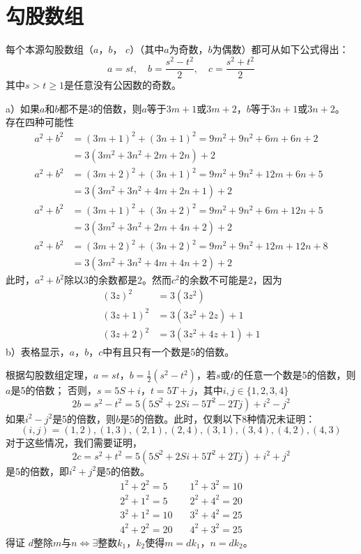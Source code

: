 \chapter{勾股数组}
\begin{theorem}[勾股数组定理]
每个本源勾股数组（$a$，$b$，  $c$）（其中$a$为奇数，$b$为偶数）都可从如下公式得出：
\[a=st,\quad b=\frac{s^2-t^2}{2},\quad c=\frac{s^2+t^2}{2}\]
其中$s>t\ge1$是任意没有公因数的奇数。
\end{theorem}
%
\exercise
a）如果$a$和$b$都不是3的倍数，则$a$等于$3m+1$或$3m+2$，$b$等于$3n+1$或$3n+2$。
存在四种可能性
\begin{align*}
a^2+b^2&=(3m+1)^2+(3n+1)^2=9m^2+9n^2+6m+6n+2\\
&=3(3m^2+3n^2+2m+2n)+2\\
a^2+b^2&=(3m+2)^2+(3n+1)^2=9m^2+9n^2+12m+6n+5\\
&=3(3m^2+3n^2+4m+2n+1)+2\\
a^2+b^2&=(3m+1)^2+(3n+2)^2=9m^2+9n^2+6m+12n+5\\
&=3(3m^2+3n^2+2m+4n+2)+2\\
a^2+b^2&=(3m+2)^2+(3n+2)^2=9m^2+9n^2+12m+12n+8\\
&=3(3m^2+3n^2+4m+4n+2)+2
\end{align*}
此时，$a^2+b^2$除以3的余数都是2。然而$c^2$的余数不可能是2，因为
\begin{align*}
(3z)^2 &= 3(3z^2) \\
(3z + 1)^2 &= 3(3z^2 + 2z) + 1 \\
(3z + 2)^2 &= 3(3z^2 + 4z + 1) + 1 
\end{align*}
b）表格显示，$a$，$b$，$c$中有且只有一个数是5的倍数。\par
\proof 根据勾股数组定理，$a=st$，$b=\frac{1}{2}(s^2-t^2)$，若$s$或$t$的任意一个数是5的倍数，则$a$是5的倍数；
否则，$s=5S+i$，$t=5T+j$，其中$i, j \in \{1,2,3,4\}$
\[2b=s^2-t^2=5(5S^2 +2Si - 5T^2-2Tj)+i^2-j^2\]
如果$i^2-j^2$是5的倍数，则$b$是5的倍数。此时，仅剩以下8种情况未证明：
\[(i,j) = (1,2), (1,3), (2,1), (2,4), (3,1), (3,4), (4,2), (4,3)\]
对于这些情况，我们需要证明，\[2c=s^2+t^2=5(5S^2 +2Si + 5T^2+2Tj)+i^2+j^2\]
是5的倍数，即$i^2+j^2$是5的倍数。
\begin{align*}
    1^2+2^2=5 &\quad 1^2+3^2=10 \\
    2^2+1^2=5 &\quad 2^2+4^2=20 \\
    3^2+1^2=10 &\quad 3^2+4^2=25 \\
    4^2+2^2=20 &\quad 4^2+3^2=25 
\end{align*}
得证
%
\exercise\proof
$d$整除$m$与$n \Leftrightarrow 
\exists$整数$k_1$，$k_2$使得$m=dk_1$，$n=dk_2$。
